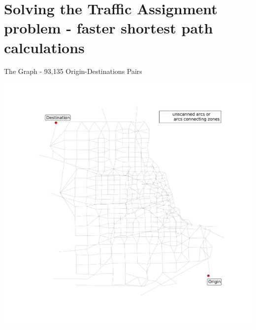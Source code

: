 \documentclass{beamer}
\begin{document}

\section{Solving the Traffic Assignment problem - faster shortest path calculations}
\begin{frame}[shrink]{The Graph - 93,135 Origin-Destinations Pairs}
    \begin{center}
        \includegraphics[page=1,width=\paperwidth, height=\paperheight, keepaspectratio,trim=0 120px 48px 120px,clip]{img/chicago_dijkstra_animation}
    \end{center}
\end{frame}
\end{document}
